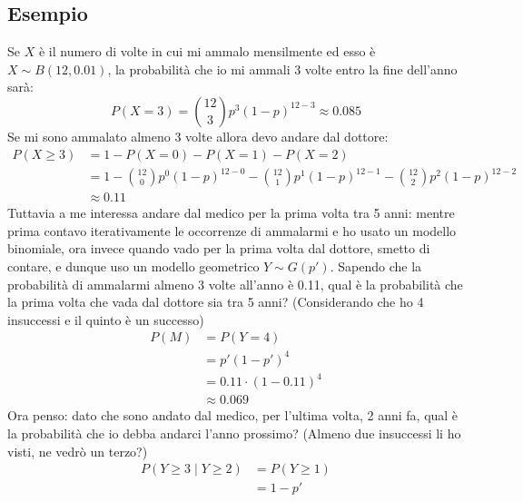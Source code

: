 \documentclass[11pt]{report}
\begin{document}
\subsection{Esempio}
Se $X$ è il numero di volte in cui mi ammalo mensilmente ed esso è $X \sim B(12, 0.01)$, la probabilità che io mi ammali 3 volte entro la fine dell'anno sarà:
\begin{equation}
    P(X = 3) = \binom{12}{3} p^3(1-p)^{12-3} \approx 0.085
\end{equation}
Se mi sono ammalato almeno 3 volte allora devo andare dal dottore:
\begin{equation}
    \begin{split}
        P(X \geq 3) & = 1 - P(X=0) - P(X=1) - P(X=2)\\
        & = 1 - \binom{12}{0} p^0(1-p)^{12-0} - \binom{12}{1} p^1(1-p)^{12-1} - \binom{12}{2} p^2(1-p)^{12-2}\\
        & \approx 0.11
    \end{split}
\end{equation}
Tuttavia a me interessa andare dal medico per la prima volta tra 5 anni: mentre prima contavo iterativamente le occorrenze di ammalarmi e ho usato un modello binomiale, ora invece quando vado per la prima volta dal dottore, smetto di contare, e dunque uso un modello geometrico $Y \sim G(p')$. Sapendo che la probabilità di ammalarmi almeno 3 volte all'anno è 0.11, qual è la probabilità che la prima volta che vada dal dottore sia tra 5 anni? (Considerando che ho 4 insuccessi e il quinto è un successo)
\begin{equation}
    \begin{split}
        P(M) & = P(Y=4)\\
        & = p'(1-p')^4\\
        & = 0.11 \cdot (1-0.11)^4\\
        & \approx 0.069
    \end{split}
\end{equation}
Ora penso: dato che sono andato dal medico, per l'ultima volta, 2 anni fa, qual è la probabilità che io debba andarci l'anno prossimo? (Almeno due insuccessi li ho visti, ne vedrò un terzo?)
\begin{equation}
    \begin{split}
        P(Y \geq 3 \mid Y \geq 2) & = P(Y \geq 1)\\
        & = 1 - p'
    \end{split}
\end{equation}
\end{document}
